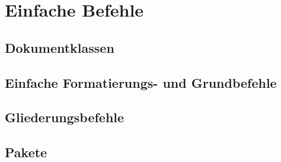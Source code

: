 \section{Einfache Befehle}

\subsection{Dokumentklassen}

\subsection{Einfache Formatierungs- und Grundbefehle}

\subsection{Gliederungsbefehle}

\subsection{Pakete}
\blindtext

\newpage